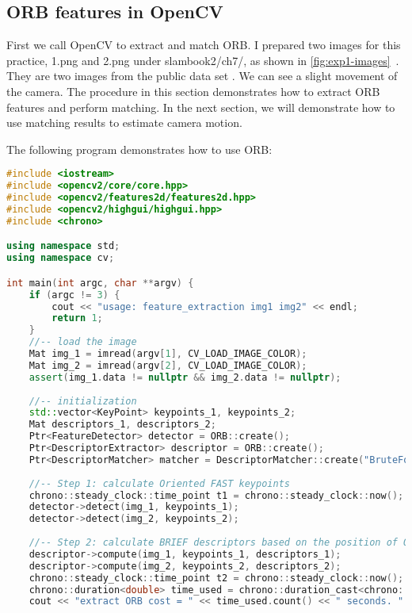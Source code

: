 \subsection{ORB features in OpenCV}
First we call OpenCV to extract and match ORB. I prepared two images for this practice, 1.png and 2.png under slambook2/ch7/, as shown in \autoref{fig:exp1-images}~. They are two images from the public data set \cite{Sturm2012}. We can see a slight movement of the camera. The procedure in this section demonstrates how to extract ORB features and perform matching. In the next section, we will demonstrate how to use matching results to estimate camera motion.

The following program demonstrates how to use ORB:
\begin{lstlisting}[language=c++,caption=slambook2/ch7/orb_cv.cpp]
#include <iostream>
#include <opencv2/core/core.hpp>
#include <opencv2/features2d/features2d.hpp>
#include <opencv2/highgui/highgui.hpp>
#include <chrono>

using namespace std;
using namespace cv;

int main(int argc, char **argv) {
    if (argc != 3) {
        cout << "usage: feature_extraction img1 img2" << endl;
        return 1;
    }
    //-- load the image
    Mat img_1 = imread(argv[1], CV_LOAD_IMAGE_COLOR);
    Mat img_2 = imread(argv[2], CV_LOAD_IMAGE_COLOR);
    assert(img_1.data != nullptr && img_2.data != nullptr);
    
    //-- initialization
    std::vector<KeyPoint> keypoints_1, keypoints_2;
    Mat descriptors_1, descriptors_2;
    Ptr<FeatureDetector> detector = ORB::create();
    Ptr<DescriptorExtractor> descriptor = ORB::create();
    Ptr<DescriptorMatcher> matcher = DescriptorMatcher::create("BruteForce-Hamming");
    
    //-- Step 1: calculate Oriented FAST keypoints
    chrono::steady_clock::time_point t1 = chrono::steady_clock::now();
    detector->detect(img_1, keypoints_1);
    detector->detect(img_2, keypoints_2);
    
    //-- Step 2: calculate BRIEF descriptors based on the position of Oriented FAST keypoints
    descriptor->compute(img_1, keypoints_1, descriptors_1);
    descriptor->compute(img_2, keypoints_2, descriptors_2);
    chrono::steady_clock::time_point t2 = chrono::steady_clock::now();
    chrono::duration<double> time_used = chrono::duration_cast<chrono::duration<double>>(t2 - t1);
    cout << "extract ORB cost = " << time_used.count() << " seconds. " << endl;
    

\end{lstlisting}
